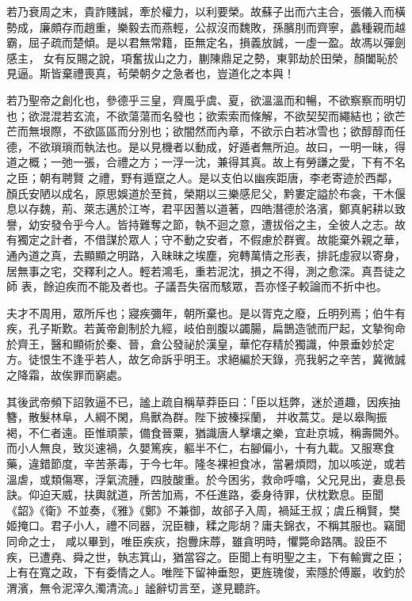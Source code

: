 \begin{pinyinscope}
 若乃衰周之末，貴詐賤誠，牽於權力，以利要榮。故蘇子出而六主合，張儀入而橫勢成，廉頗存而趙重，樂毅去而燕輕，公叔沒而魏敗，孫臏刖而齊寧，蠡種親而越霸，屈子疏而楚傾。是以君無常籍，臣無定名，損義放誠，一虛一盈。故馮以彈劍感主，
 女有反賜之說，項奮拔山之力，蒯陳鼎足之勢，東郭劫於田榮，顏闔恥於見逼。斯皆棄禮喪真，茍榮朝夕之急者也，豈道化之本與！



 若乃聖帝之創化也，參德乎三皇，齊風乎虞、夏，欲溫溫而和暢，不欲察察而明切也；欲混混若玄流，不欲蕩蕩而名發也；欲索索而條解，不欲契契而繩結也；欲芒芒而無垠際，不欲區區而分別也；欲闇然而內章，不欲示白若冰雪也；欲醇醇而任德，不欲瑣瑣而執法也。是以見機者以動成，好遁者無所迫。故曰，一明一昧，得道之概；一弛一張，合禮之方；一浮一沈，兼得其真。故上有勞謙之愛，下有不名之臣；朝有聘賢
 之禮，野有遁竄之人。是以支伯以幽疾距唐，李老寄迹於西鄰，顏氏安陋以成名，原思娛道於至貧，榮期以三樂感尼父，黔婁定謚於布衾，干木偃息以存魏，荊、萊志邁於江岑，君平因蓍以道著，四皓潛德於洛濱，鄭真躬耕以致譽，幼安發令乎今人。皆持難奪之節，執不迴之意，遭拔俗之主，全彼人之志。故有獨定之計者，不借謀於眾人；守不動之安者，不假慮於群賓。故能棄外親之華，通內道之真，去顯顯之明路，入昧昧之埃塵，宛轉萬情之形表，排託虛寂以寄身，居無事之宅，交釋利之人。輕若鴻毛，重若泥沈，損之不得，測之愈深。真吾徒之師
 表，餘迫疾而不能及者也。子議吾失宿而駭眾，吾亦怪子較論而不折中也。



 夫才不周用，眾所斥也；寢疾彌年，朝所棄也。是以胥克之廢，丘明列焉；伯牛有疾，孔子斯歎。若黃帝創制於九經，岐伯剖腹以蠲腸，扁鵲造虢而尸起，文摯徇命於齊王，醫和顯術於秦、晉，倉公發祕於漢皇，華佗存精於獨識，仲景垂妙於定方。徒恨生不逢乎若人，故乞命訴乎明王。求絕編於天錄，亮我躬之辛苦，冀微誠之降霜，故俟罪而窮處。



 其後武帝頻下詔敦逼不已，謐上疏自稱草莽臣曰：「臣以尪弊，迷於道趣，因疾抽簪，散髮林阜，人綱不閑，鳥獸為群。陛下披榛採蘭，
 并收蒿艾。是以皋陶振褐，不仁者遠。臣惟頑蒙，備食晉粟，猶識唐人擊壤之樂，宜赴京城，稱壽闕外。而小人無良，致災速禍，久嬰篤疾，軀半不仁，右腳偏小，十有九載。又服寒食藥，違錯節度，辛苦荼毒，于今七年。隆冬裸袒食冰，當暑煩悶，加以咳逆，或若溫虐，或類傷寒，浮氣流腫，四肢酸重。於今困劣，救命呼噏，父兄見出，妻息長訣。仰迫天威，扶輿就道，所苦加焉，不任進路，委身待罪，伏枕歎息。臣聞《韶》《衛》不並奏，《雅》《鄭》不兼御，故郤子入周，禍延王叔；虞丘稱賢，樊姬掩口。君子小人，禮不同器，況臣糠，糅之彫胡？庸夫錦衣，不稱其服也。竊聞同命之士，
 咸以畢到，唯臣疾疢，抱釁床蓐，雖貪明時，懼斃命路隅。設臣不疾，已遭堯、舜之世，執志箕山，猶當容之。臣聞上有明聖之主，下有輸實之臣；上有在寬之政，下有委情之人。唯陛下留神垂恕，更旌瑰俊，索隱於傅巖，收釣於渭濱，無令泥滓久濁清流。」謐辭切言至，遂見聽許。




\end{pinyinscope}
